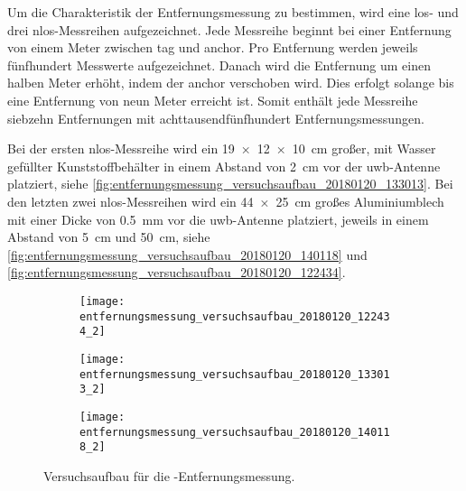 Um die Charakteristik der Entfernungsmessung zu bestimmen, wird eine \Gls{los}- und drei \Gls{nlos}-Messreihen aufgezeichnet. Jede Messreihe beginnt bei einer Entfernung von einem Meter zwischen \Gls{tag} und \Gls{anchor}. Pro Entfernung werden jeweils fünfhundert Messwerte aufgezeichnet. Danach wird die Entfernung um einen halben Meter erhöht, indem der \Gls{anchor} verschoben wird. Dies erfolgt solange bis eine Entfernung von neun Meter erreicht ist. Somit enthält jede Messreihe siebzehn Entfernungen mit achttausendfünfhundert Entfernungsmessungen.

Bei der ersten \Gls{nlos}-Messreihe wird ein \SI{19x12x10}{\centi\meter} großer, mit Wasser gefüllter Kunststoffbehälter in einem Abstand von \SI{2}{\centi\meter} vor der \Gls{uwb}-Antenne platziert, siehe \autoref{fig:entfernungsmessung_versuchsaufbau_20180120_133013}. Bei den letzten zwei \Gls{nlos}-Messreihen wird ein \SI{44x25}{\centi\meter} großes Aluminiumblech mit einer Dicke von \SI{0.5}{\milli\meter} vor die \Gls{uwb}-Antenne platziert, jeweils in einem Abstand von \SI{5}{\centi\meter} und \SI{50}{\centi\meter}, siehe \autoref{fig:entfernungsmessung_versuchsaufbau_20180120_140118} und \autoref{fig:entfernungsmessung_versuchsaufbau_20180120_122434}.


\begin{figure}[ht]
	\begin{minipage}{0.49\linewidth}
		\begin{subfigure}{\linewidth}
			\texttt{[image: entfernungsmessung\_versuchsaufbau\_20180120\_122434\_2]}
			\caption{ }
			\label{fig:entfernungsmessung_versuchsaufbau_20180120_122434}
		\end{subfigure}
	\end{minipage}
	\hfill
	\begin{minipage}{0.49\linewidth}
			\begin{minipage}{\linewidth}
				\begin{subfigure}{\linewidth}
					\texttt{[image: entfernungsmessung\_versuchsaufbau\_20180120\_133013\_2]}
					\caption{ }
					\label{fig:entfernungsmessung_versuchsaufbau_20180120_133013}
				\end{subfigure}
			\end{minipage}
			\par
			\bigskip
			\begin{minipage}{\linewidth}
				\begin{subfigure}{\linewidth}
					\texttt{[image: entfernungsmessung\_versuchsaufbau\_20180120\_140118\_2]}
					\caption{ }
					\label{fig:entfernungsmessung_versuchsaufbau_20180120_140118}
				\end{subfigure}	
			\end{minipage}
	\end{minipage}
	\caption{Versuchsaufbau für die -Entfernungsmessung.}
	\label{fig:entfernungsmessung_versuchsaufbau_20180120}
\end{figure}


